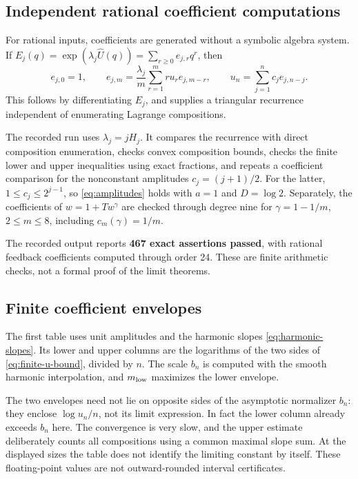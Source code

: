 \documentclass[11pt,a4paper]{article}
\numberwithin{equation}{section}
\theoremstyle{definition}
\theoremstyle{remark}
\newcommand{\Uhat}{\widehat U}
\begin{document}
\subsection{Independent rational coefficient computations}
For rational inputs, coefficients are generated without a symbolic
algebra system. If
$E_j(q)=\exp(\lambda_j\Uhat(q))=\sum_{r\ge0}e_{j,r}q^r$, then
\begin{equation}
 e_{j,0}=1,\qquad
 e_{j,m}=\frac{\lambda_j}{m}
            \sum_{r=1}^m r u_r e_{j,m-r},\qquad
 u_n=\sum_{j=1}^n c_j e_{j,n-j}.
 \label{eq:code-recurrence}
\end{equation}
This follows by differentiating $E_j$, and supplies a triangular
recurrence independent of enumerating Lagrange compositions.

The recorded run uses $\lambda_j=jH_j$. It compares the recurrence
with direct composition enumeration, checks convex composition bounds,
checks the finite lower and upper inequalities using exact fractions,
and repeats a coefficient comparison for the nonconstant amplitudes
$c_j=(j+1)/2$. For the latter,
$1\le c_j\le2^{j-1}$, so \eqref{eq:amplitudes} holds with $a=1$ and
$D=\log2$. Separately, the coefficients of
$w=1+Tw^\gamma$ are checked through degree nine for
$\gamma=1-1/m$, $2\le m\le8$, including $c_m(\gamma)=1/m$.

The recorded output reports \textbf{467 exact assertions passed}, with
rational feedback coefficients computed through order 24. These are
finite arithmetic checks, not a formal proof of the limit theorems.

\subsection{Finite coefficient envelopes}
The first table uses unit amplitudes and the harmonic slopes
\eqref{eq:harmonic-slopes}. Its lower and upper columns are the logarithms
of the two sides of \eqref{eq:finite-u-bound}, divided by $n$.
The scale $b_n$ is computed with the smooth harmonic interpolation, and
$m_{\rm low}$ maximizes the lower envelope.
\begin{center}
\small

\end{center}
The two envelopes need not lie on opposite sides of the asymptotic
normalizer $b_n$: they enclose $\log u_n/n$, not its limit expression.
In fact the lower column already exceeds $b_n$ here. The convergence
is very slow, and the upper estimate deliberately counts all compositions
using a common maximal slope sum. At the displayed sizes the table does
not identify the limiting constant by itself. These floating-point values
are not outward-rounded interval certificates.
\end{document}
